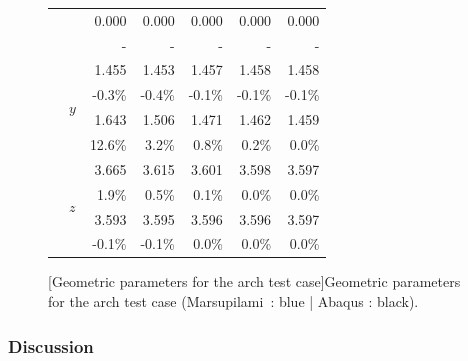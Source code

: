 \begin{figure}[p]
\begin{fullpage}
\begin{tabularx}{0.75\textwidth}{@{} XX rrrrr@{}}
&&{\color{black}\normalsize0.000}&{\color{black}\normalsize0.000}&{\color{black}\normalsize0.000}&{\color{black}\normalsize0.000}&{\color{black}\normalsize0.000}\\
&&{\color{black}\scriptsize-}&{\color{black}\scriptsize-}&{\color{black}\scriptsize-}&{\color{black}\scriptsize-}&{\color{black}\scriptsize-}\\\cmidrule[0.5\cmidrulewidth]{2-7}
&\multirow{4}{*}{$y$}&{\color{Tblue}\normalsize1.455}&{\color{Tblue}\normalsize1.453}&{\color{Tblue}\normalsize1.457}&{\color{Tblue}\normalsize1.458}&{\color{Tblue}\normalsize1.458}\\
&&{\color{Tblue}\scriptsize-0.3\%}&{\color{Tblue}\scriptsize-0.4\%}&{\color{Tblue}\scriptsize-0.1\%}&{\color{Tblue}\scriptsize-0.1\%}&{\color{Tblue}\scriptsize-0.1\%}\\
&&{\color{black}\normalsize1.643}&{\color{black}\normalsize1.506}&{\color{black}\normalsize1.471}&{\color{black}\normalsize1.462}&{\color{black}\normalsize1.459}\\
&&{\color{black}\scriptsize12.6\%}&{\color{black}\scriptsize3.2\%}&{\color{black}\scriptsize0.8\%}&{\color{black}\scriptsize0.2\%}&{\color{black}\scriptsize0.0\%}\\\cmidrule[0.5\cmidrulewidth]{2-7}
&\multirow{4}{*}{$z$}&{\color{Tblue}\normalsize3.665}&{\color{Tblue}\normalsize3.615}&{\color{Tblue}\normalsize3.601}&{\color{Tblue}\normalsize3.598}&{\color{Tblue}\normalsize3.597}\\
&&{\color{Tblue}\scriptsize1.9\%}&{\color{Tblue}\scriptsize0.5\%}&{\color{Tblue}\scriptsize0.1\%}&{\color{Tblue}\scriptsize0.0\%}&{\color{Tblue}\scriptsize0.0\%}\\
&&{\color{black}\normalsize3.593}&{\color{black}\normalsize3.595}&{\color{black}\normalsize3.596}&{\color{black}\normalsize3.596}&{\color{black}\normalsize3.597}\\
&&{\color{black}\scriptsize-0.1\%}&{\color{black}\scriptsize-0.1\%}&{\color{black}\scriptsize0.0\%}&{\color{black}\scriptsize0.0\%}&{\color{black}\scriptsize0.0\%}\\
\bottomrule
\end{tabularx}
[Geometric parameters for the arch test case]{Geometric parameters for the arch test case (Marsupilami~: blue | Abaqus : black).}
\label{tab:resA_geo}
\end{fullpage}
\end{figure}

\subsubsection{Discussion}

